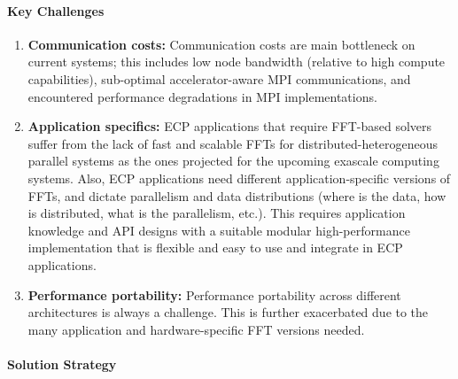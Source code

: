 \paragraph{Key  Challenges}
\begin{enumerate}
\item
\textbf{Communication costs:}
Communication costs are main bottleneck 
on current systems; this includes low node bandwidth (relative to 
high compute capabilities), sub-optimal accelerator-aware MPI communications,
and encountered performance degradations in MPI implementations.

\item
\textbf{Application specifics:}
ECP applications that require FFT-based solvers suffer from the lack of fast 
and scalable FFTs for distributed-heterogeneous parallel systems 
as the ones projected for the upcoming exascale computing systems. Also, ECP 
applications need different application-specific versions of FFTs,
and dictate parallelism and data distributions (where is the data, how is 
distributed, what is the parallelism, etc.). This requires application
knowledge and API designs with a suitable modular high-performance 
implementation that is flexible and easy to use and integrate in ECP applications.

\item
\textbf{Performance portability:}
Performance portability across different architectures is always a challenge.
This is further exacerbated due to the many application and 
hardware-specific FFT versions needed.
\end{enumerate}

\paragraph{Solution Strategy}

